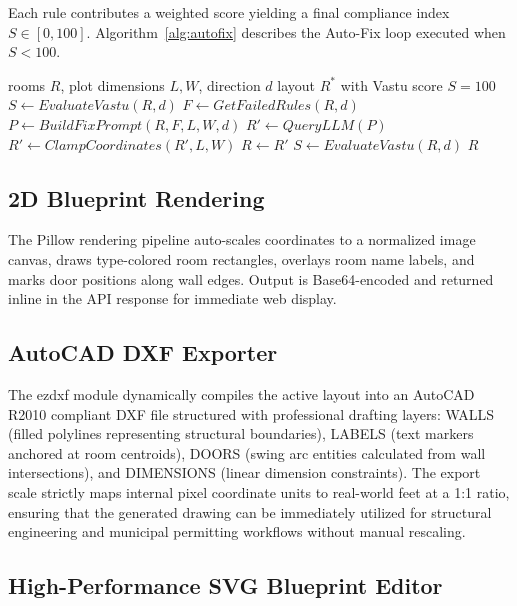 \documentclass[10pt, twocolumn, letterpaper]{article}
\begin{document}
Each rule contributes a weighted score yielding a final compliance index
$S \in [0,100]$. Algorithm~\ref{alg:autofix} describes the Auto-Fix loop
executed when $S < 100$.

\begin{algorithm}[ht]
\caption{Vastu Auto-Fix Iterative Correction}
\label{alg:autofix}
\begin{algorithmic}[1]
\REQUIRE rooms $R$, plot dimensions $L, W$, direction $d$
\ENSURE layout $R^*$ with Vastu score $S = 100$
\STATE $S \leftarrow EvaluateVastu(R, d)$
  \STATE $F \leftarrow GetFailedRules(R, d)$
  \STATE $P \leftarrow BuildFixPrompt(R, F, L, W, d)$
  \STATE $R' \leftarrow QueryLLM(P)$
  \STATE $R' \leftarrow ClampCoordinates(R', L, W)$
  \STATE $R \leftarrow R'$
  \STATE $S \leftarrow EvaluateVastu(R, d)$
\ENDWHILE
\RETURN $R$
\end{algorithmic}
\end{algorithm}

\subsection{2D Blueprint Rendering}

The Pillow rendering pipeline auto-scales coordinates to a normalized image
canvas, draws type-colored room rectangles, overlays room name labels, and
marks door positions along wall edges. Output is Base64-encoded and returned
inline in the API response for immediate web display.

\subsection{AutoCAD DXF Exporter}

The ezdxf module dynamically compiles the active layout into an AutoCAD R2010
compliant DXF file structured with professional drafting layers:
WALLS (filled polylines representing structural boundaries),
LABELS (text markers anchored at room centroids),
DOORS (swing arc entities calculated from wall intersections), and
DIMENSIONS (linear dimension constraints). The export scale strictly maps
internal pixel coordinate units to real-world feet at a 1:1 ratio, ensuring
that the generated drawing can be immediately utilized for structural
engineering and municipal permitting workflows without manual rescaling.

\subsection{High-Performance SVG Blueprint Editor}
\end{document}
